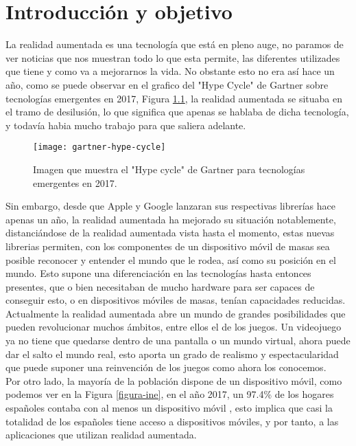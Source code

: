 \chapter{Introducción y objetivo}
\label{ch:introduccion}

La realidad aumentada es una tecnología que está en pleno auge, no paramos de ver noticias que nos muestran todo lo que esta permite, las diferentes utilizades que tiene y como va a mejorarnos la vida. No obstante esto no era así hace un año, como se puede observar en el grafico del "Hype Cycle" de Gartner sobre tecnologías emergentes en 2017, Figura \ref{figura-gartner}, la realidad aumentada se situaba en el tramo de desilusión, lo que significa que apenas se hablaba de dicha tecnología, y todavía habia mucho trabajo para que saliera adelante.\\

\begin{figure}[h]
  \centering
  \texttt{[image: gartner-hype-cycle]}
  \caption{Imagen que muestra el "Hype cycle" de Gartner para tecnologías emergentes en 2017.\protect\footnotemark}
  \label{figura-gartner}
\end{figure}


Sin embargo, desde que Apple y Google lanzaran sus respectivas librerías hace apenas un año, la realidad aumentada ha mejorado su situación notablemente, distanciándose de la realidad aumentada vista hasta el momento, estas nuevas librerias permiten, con los componentes de un dispositivo móvil de masas sea posible reconocer y entender el mundo que le rodea, así como su posición en el mundo. Esto supone una diferenciación en las tecnologías hasta entonces presentes, que o bien necesitaban de mucho hardware para ser capaces de conseguir esto, o en dispositivos móviles de masas, tenían capacidades reducidas.\\

Actualmente la realidad aumentada abre un mundo de grandes posibilidades que pueden revolucionar muchos ámbitos, entre ellos el de los juegos. Un videojuego ya no tiene que quedarse dentro de una pantalla o un mundo virtual, ahora puede dar el salto el mundo real, esto aporta un grado de realismo y espectacularidad que puede suponer una reinvención de los juegos como ahora los conocemos.\\

Por otro lado, la mayoría de la población dispone de un dispositivo móvil, como podemos ver en la Figura \ref{figura-ine}, en el año 2017, un 97.4\% de los hogares españoles contaba con al menos un dispositivo móvil \cite{ine}, esto implica que casi la totalidad de los españoles tiene acceso a dispositivos móviles, y por tanto, a las aplicaciones que utilizan realidad aumentada.

